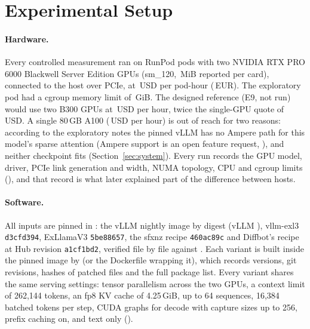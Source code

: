 \section{Experimental Setup}\label{sec:setup}

\paragraph{Hardware.}
Every controlled measurement ran on RunPod pods with two NVIDIA RTX PRO 6000 Blackwell Server Edition GPUs (sm\_120,
\,MiB reported per card), connected to the host over PCIe, at \,USD
per pod-hour (\,EUR). The exploratory pod had a cgroup memory limit of
\,GiB. The designed reference (E9, not run) would use two B300 GPUs at
\,USD per hour, twice the single-GPU quote of \,USD. A single 80\,GB
A100 (\,USD per hour) is out of reach for two reasons: according to the exploratory notes the
pinned vLLM has no Ampere path for this model's sparse attention (Ampere support is an open feature request,
), and neither checkpoint fits (Section~\ref{sec:system}). Every run
records the GPU model, driver, PCIe link generation and width, NUMA topology, CPU and cgroup limits
(), and that record is what later explained part of the difference between hosts.

\paragraph{Software.}
All inputs are pinned in : the vLLM nightly image by digest (vLLM ),
vllm-exl3 \texttt{d3cfd394}, ExLlamaV3 \texttt{5be88657}, the sfxnz recipe \texttt{460ac89c} and Diffbot's recipe at Hub
revision \texttt{a1cf1bd2}, verified file by file against . Each variant is built
inside the pinned image by  (or the Dockerfile wrapping it), which records
versions, git revisions, hashes of patched files and the full package list. Every variant shares the same serving
settings: tensor parallelism across the two GPUs, a context limit of 262,144 tokens, an fp8 KV cache of 4.25\,GiB, up to
64 sequences, 16,384 batched tokens per step, CUDA graphs for decode with capture sizes up to 256, prefix caching on,
and text only ().

